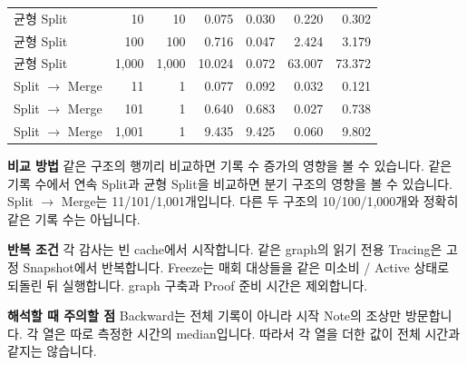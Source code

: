 \documentclass[11pt,a4paper]{article}
\begin{document}
\begin{minipage}{\linewidth}
\begin{center}
\begin{tabular}{@{}lrrrrrr@{}}
균형 Split & 10 & 10 & 0.075 & 0.030 & 0.220 & 0.302 \\
균형 Split & 100 & 100 & 0.716 & 0.047 & 2.424 & 3.179 \\
균형 Split & 1,000 & 1,000 & 10.024 & 0.072 & 63.007 & 73.372 \\
Split $\rightarrow$ Merge & 11 & 1 & 0.077 & 0.092 & 0.032 & 0.121 \\
Split $\rightarrow$ Merge & 101 & 1 & 0.640 & 0.683 & 0.027 & 0.738 \\
Split $\rightarrow$ Merge & 1,001 & 1 & 9.435 & 9.425 & 0.060 & 9.802 \\
\bottomrule\end{tabular}\end{center}
\end{minipage}\par\medskip
\textbf{비교 방법}\newline
같은 구조의 행끼리 비교하면 기록 수 증가의 영향을 볼 수 있습니다.\newline
같은 기록 수에서 연속 Split과 균형 Split을 비교하면 분기 구조의 영향을 볼 수 있습니다.\newline
Split $\rightarrow$ Merge는 11/101/1,001개입니다.\newline
다른 두 구조의 10/100/1,000개와 정확히 같은 기록 수는 아닙니다.\par\smallskip
\textbf{반복 조건}\newline
각 감사는 빈 cache에서 시작합니다.\newline
같은 graph의 읽기 전용 Tracing은 고정 Snapshot에서 반복합니다.\newline
Freeze는 매회 대상들을 같은 미소비 / Active 상태로 되돌린 뒤 실행합니다.\newline
graph 구축과 Proof 준비 시간은 제외합니다.\par\smallskip
\textbf{해석할 때 주의할 점}\newline
Backward는 전체 기록이 아니라 시작 Note의 조상만 방문합니다.\newline
각 열은 따로 측정한 시간의 median입니다.\newline
따라서 각 열을 더한 값이 전체 시간과 같지는 않습니다.
\end{document}
